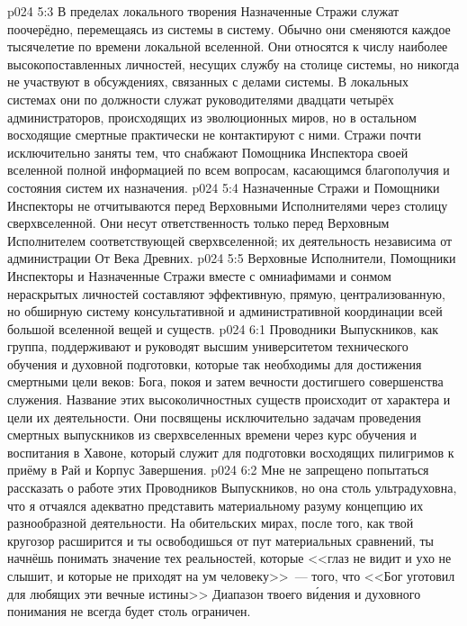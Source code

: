 \vs p024 5:3 В пределах локального творения Назначенные Стражи служат поочерёдно, перемещаясь из системы в систему. Обычно они сменяются каждое тысячелетие по времени локальной вселенной. Они относятся к числу наиболее высокопоставленных личностей, несущих службу на столице системы, но никогда не участвуют в обсуждениях, связанных с делами системы. В локальных системах они по должности служат руководителями двадцати четырёх администраторов, происходящих из эволюционных миров, но в остальном восходящие смертные практически не контактируют с ними. Стражи почти исключительно заняты тем, что снабжают Помощника Инспектора своей вселенной полной информацией по всем вопросам, касающимся благополучия и состояния систем их назначения.
\vs p024 5:4 Назначенные Стражи и Помощники Инспекторы не отчитываются перед Верховными Исполнителями через столицу сверхвселенной. Они несут ответственность только перед Верховным Исполнителем соответствующей сверхвселенной; их деятельность независима от администрации От Века Древних.
\vs p024 5:5 \pc Верховные Исполнители, Помощники Инспекторы и Назначенные Стражи вместе с омниафимами и сонмом нераскрытых личностей составляют эффективную, прямую, централизованную, но обширную систему консультативной и административной координации всей большой вселенной вещей и существ.
\vs p024 6:1 Проводники Выпускников, как группа, поддерживают и руководят высшим университетом технического обучения и духовной подготовки, которые так необходимы для достижения смертными цели веков: Бога, покоя и затем вечности достигшего совершенства служения. Название этих высоколичностных существ происходит от характера и цели их деятельности. Они посвящены исключительно задачам проведения смертных выпускников из сверхвселенных времени через курс обучения и воспитания в Хавоне, который служит для подготовки восходящих пилигримов к приёму в Рай и Корпус Завершения.
\vs p024 6:2 Мне не запрещено попытаться рассказать о работе этих Проводников Выпускников, но она столь ультрадуховна, что я отчаялся адекватно представить материальному разуму концепцию их разнообразной деятельности. На обительских мирах, после того, как твой кругозор расширится и ты освободишься от пут материальных сравнений, ты начнёшь понимать значение тех реальностей, которые <<глаз не видит и ухо не слышит, и которые не приходят на ум человеку>>~--- того, что <<Бог уготовил для любящих эти вечные истины>> Диапазон твоего в\'идения и духовного понимания не всегда будет столь ограничен.
